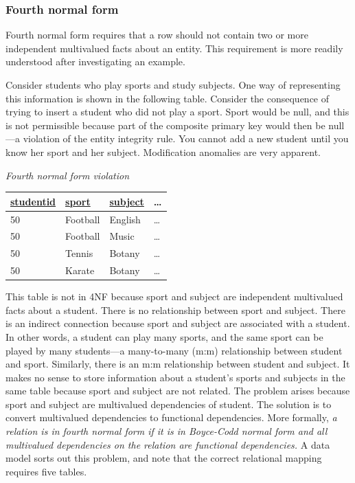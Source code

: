 \documentclass[
]{article}
\begin{document}
\hypertarget{fourth-normal-form}{%
\subsubsection*{Fourth normal form}\label{fourth-normal-form}}

Fourth normal form requires that a row should not contain two or more
independent multivalued facts about an entity. This requirement is more
readily understood after investigating an example.

Consider students who play sports and study subjects. One way of
representing this information is shown in the following table. Consider
the consequence of trying to insert a student who did not play a sport.
Sport would be null, and this is not permissible because part of the
composite primary key would then be null---a violation of the entity
integrity rule. You cannot add a new student until you know her sport
and her subject. Modification anomalies are very apparent.

\emph{Fourth normal form violation}

\begin{longtable}[]{@{}llll@{}}
\toprule
\underline{studentid} & \underline{sport} & \underline{subject} & \ldots{} \\
\midrule
\endhead
50 & Football & English & \ldots{} \\
50 & Football & Music & \ldots{} \\
50 & Tennis & Botany & \ldots{} \\
50 & Karate & Botany & \ldots{} \\
\bottomrule
\end{longtable}

This table is not in 4NF because sport and subject are independent
multivalued facts about a student. There is no relationship between
sport and subject. There is an indirect connection because sport and
subject are associated with a student. In other words, a student can
play many sports, and the same sport can be played by many students---a
many-to-many (m:m) relationship between student and sport. Similarly,
there is an m:m relationship between student and subject. It makes no
sense to store information about a student's sports and subjects in the
same table because sport and subject are not related. The problem arises
because sport and subject are multivalued dependencies of student. The
solution is to convert multivalued dependencies to functional
dependencies. More formally, \emph{a relation is in fourth normal form if it
is in Boyce-Codd normal form and all multivalued dependencies on the
relation are functional dependencies.} A data model sorts out this
problem, and note that the correct relational mapping requires five
tables.
\end{document}
